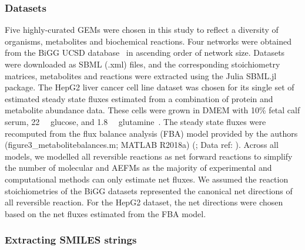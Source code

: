 \documentclass[12pt]{article}
\begin{document}
\subsubsection*{Datasets}

\nocite{OrthJeffreyD2010RaUo}
\nocite{OrthJeffreyD2010RaUoDATASET}
\nocite{BeckerScottA2005Grot}
\nocite{BeckerScottA2005GrotDATASET}
\nocite{BordbarAarash2011iApd}
\nocite{BordbarAarash2011iApdDATASET}
\nocite{ThieleInes2005EMRo}
\nocite{ThieleInes2005EMRoDATASET}

Five highly-curated GEMs were chosen in this study to reflect a diversity
of organisms, metabolites and biochemical reactions. Four networks were
obtained from the BiGG UCSD database~\citep{KingZacharyA2016BMAp} in
ascending order of network size. Datasets were downloaded as SBML (.xml)
files, and the corresponding stoichiometry matrices, metabolites and
reactions were extracted using the Julia SBML.jl package. The HepG2 liver
cancer cell line dataset was chosen for its single set of estimated steady
state fluxes estimated from a combination of protein and metabolite
abundance data. These cells were grown in DMEM with 10\% fetal calf serum,
22\SI{}{\milli\molar} glucose, and 1.8\SI{}{\milli\molar}
glutamine~\citep{NilssonAvlant2020Qaoa}. The steady state fluxes were
recomputed from the flux balance analysis (FBA) model provided by the
authors (figure3\_metabolitebalances.m; MATLAB R2018a)
(\citealt{NilssonAvlant2020Qaoa}; Data ref:
\citealt{NilssonAvlant2020QaoaDATASET}). Across all models, we modelled
all reversible reactions as net forward reactions to simplify the number
of molecular and AEFMs as the majority of experimental and computational
methods can only estimate net fluxes. We assumed the reaction
stoichiometries of the BiGG datasets represented the canonical net
directions of all reversible reaction. For the HepG2 dataset, the net
directions were chosen based on the net fluxes estimated from the FBA
model.

\subsubsection*{Extracting SMILES strings}
\end{document}
